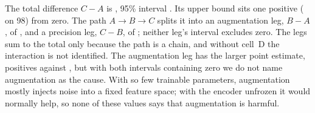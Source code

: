 The total difference $C - A$ is \augprecTotal{}, 95\% interval \augprecTotalCI. Its upper bound
sits one positive (\augprecOnePos{} on 98) from zero. The path $A \to B \to C$ splits it into
an augmentation leg, $B - A$, of \augprecAug{} \augprecAugCI, and a precision leg, $C - B$, of
\augprecPrec{} \augprecPrecCI; neither leg's interval excludes zero. The legs sum to the total
only because the path is a chain, and without cell~D the interaction is not identified. The
augmentation leg has the larger point estimate, \augprecAugLenses{} positives against
\augprecPrecLenses{}, but with both intervals containing zero we do not name augmentation as
the cause. With so few trainable parameters, augmentation mostly injects noise into a fixed
feature space; with the encoder unfrozen it would normally help, so none of these values says
that augmentation is harmful.


